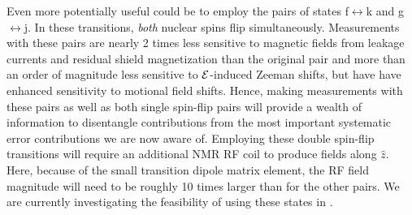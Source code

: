 Even more potentially useful could be to employ the pairs of states f$\leftrightarrow$k and g$\leftrightarrow$j.  In these transitions, \textit{both} nuclear spins flip simultaneously. Measurements with these pairs are nearly 2 times less sensitive to magnetic fields from leakage currents and residual shield magnetization than the original pair and more than an order of magnitude less sensitive to $\mathcal{E}$-induced Zeeman shifts, but have have enhanced sensitivity to motional field shifts.  Hence, making measurements with these pairs as well as both single spin-flip pairs will provide a wealth of information to disentangle contributions from the most important systematic error contributions we are now aware of.  Employing these double spin-flip transitions will require an additional NMR RF coil to produce fields along $\hat{z}$. Here, because of the small transition dipole matrix element, the RF field magnitude will need to be roughly 10 times larger than for the other pairs.  We are currently investigating the feasibility of using these states in \CENTREX.
